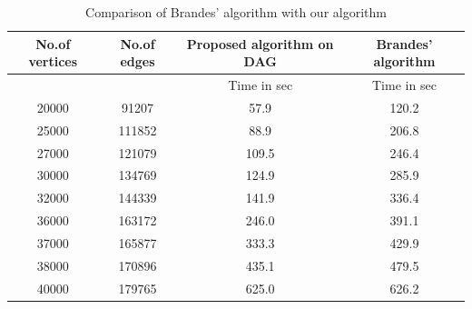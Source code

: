 \begin{table}[h!]
\centering
\begin{tabular}{|c|c|c|c|}
\hline
No.of vertices & No.of edges & Proposed algorithm on DAG & Brandes' algorithm \\
\hline
 & & Time in sec & Time in sec\\ 
\hline
20000 & 91207 & 57.9 & 120.2 \\ 
\hline
25000 & 111852 & 88.9 & 206.8 \\ 
\hline
27000 & 121079 & 109.5 & 246.4 \\ 
\hline
30000 & 134769 & 124.9 & 285.9 \\ 
\hline
32000 & 144339 & 141.9 & 336.4 \\ 
\hline
36000 & 163172 & 246.0 & 391.1 \\ 
\hline
37000 & 165877 & 333.3 & 429.9 \\ 
\hline
38000 & 170896 & 435.1 & 479.5 \\ 
\hline
40000 & 179765 & 625.0 & 626.2 \\ 
\hline
\end{tabular}
\caption{Comparison of Brandes' algorithm with our algorithm}
\label{tab:res2}
\end{table}